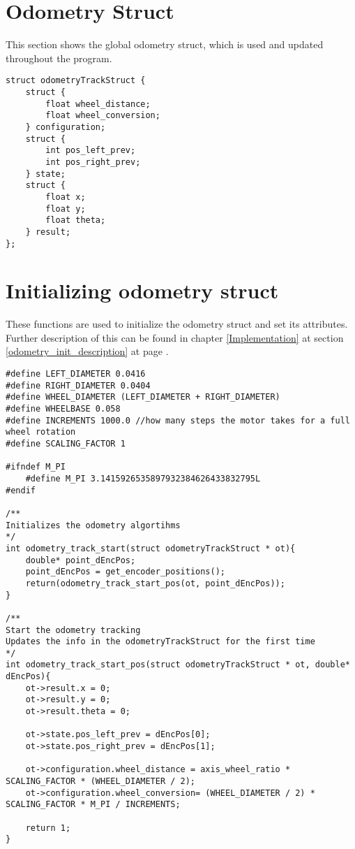 \section{Odometry Struct}
\label{odometry_struct_code}
This section shows the global odometry struct, which is used and updated throughout the program. 
\begin{lstlisting}[caption = {Odometry struct}]
 struct odometryTrackStruct {
	struct {
		float wheel_distance;
		float wheel_conversion;
	} configuration;
	struct {
		int pos_left_prev;
		int pos_right_prev;
	} state;
	struct {
		float x;
		float y;
		float theta;
	} result;
};
\end{lstlisting}

\section{Initializing odometry struct}
\label{odometry_init_code}
These functions are used to initialize the odometry struct and set its attributes.
Further description of this can be found in chapter \ref{Implementation} at section \ref{odometry_init_description} at page \pageref{odometry_init_description}.
\begin{lstlisting}[caption = {Initializing odometry struct}]
#define LEFT_DIAMETER 0.0416
#define RIGHT_DIAMETER 0.0404
#define WHEEL_DIAMETER (LEFT_DIAMETER + RIGHT_DIAMETER)
#define WHEELBASE 0.058 
#define INCREMENTS 1000.0 //how many steps the motor takes for a full wheel rotation
#define SCALING_FACTOR 1 

#ifndef M_PI
	#define M_PI 3.1415926535897932384626433832795L
#endif

/**
Initializes the odometry algortihms
*/
int odometry_track_start(struct odometryTrackStruct * ot){
	double* point_dEncPos;
	point_dEncPos = get_encoder_positions();
	return(odometry_track_start_pos(ot, point_dEncPos));
}

/**
Start the odometry tracking
Updates the info in the odometryTrackStruct for the first time
*/
int odometry_track_start_pos(struct odometryTrackStruct * ot, double* dEncPos){
	ot->result.x = 0;
	ot->result.y = 0;
	ot->result.theta = 0;
	
	ot->state.pos_left_prev = dEncPos[0];
	ot->state.pos_right_prev = dEncPos[1];
	
	ot->configuration.wheel_distance = axis_wheel_ratio * SCALING_FACTOR * (WHEEL_DIAMETER / 2);
	ot->configuration.wheel_conversion= (WHEEL_DIAMETER / 2) * SCALING_FACTOR * M_PI / INCREMENTS;
	
	return 1;
}
\end{lstlisting}

